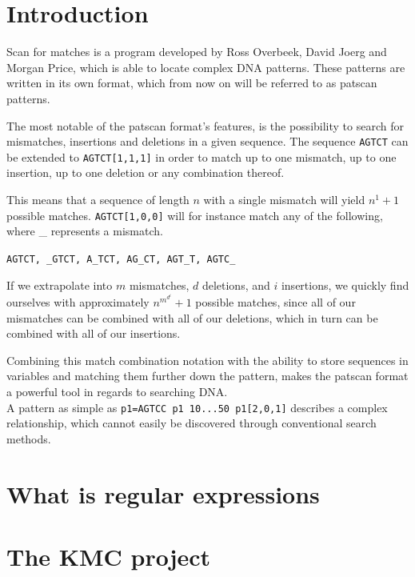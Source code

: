 \documentclass[12pt]{article}
\begin{document}
\newpage

\section{Introduction}

Scan for matches is a program developed by Ross Overbeek, David Joerg and Morgan Price, which is able to locate complex DNA patterns. These patterns are written in its own format, which from now on will be referred to as patscan patterns.\cite{scan-for-matches}

The most notable of the patscan format's features, is the possibility to search for mismatches, insertions and deletions in a given sequence. The sequence \texttt{AGTCT} can be extended to \texttt{AGTCT[1,1,1]} in order to match up to one mismatch, up to one insertion, up to one deletion or any combination thereof.

This means that a sequence of length $n$ with a single mismatch will yield $n^1+1$ possible matches. \texttt{AGTCT[1,0,0]} will for instance match any of the following, where \_ represents a mismatch.

\texttt{AGTCT, \_GTCT, A\_TCT, AG\_CT, AGT\_T, AGTC\_}

If we extrapolate into $m$ mismatches, $d$ deletions, and $i$ insertions, we quickly find ourselves with approximately  $n^{m^{d^{i}}}+1$ possible matches, since all of our mismatches can be combined with all of our deletions, which in turn can be combined with all of our insertions.

Combining this match combination notation with the ability to store sequences in variables and matching them further down the pattern, makes the patscan format a powerful tool in regards to searching DNA. \\
A pattern as simple as \texttt{p1=AGTCC p1 10...50 p1[2,0,1]} describes a complex relationship, which cannot easily be discovered through conventional search methods.

\newpage

\section{What is regular expressions}

\newpage

\section{The KMC project}
\end{document}
